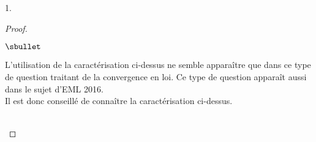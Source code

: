 \begin{noliste}{1.}
\begin{proof}
\begin{remark}
\begin{noliste}{$\sbullet$}
  \item L'utilisation de la caractérisation ci-dessus ne semble
    apparaître que dans ce type de question traitant de la convergence
    en loi. Ce type de question apparaît aussi dans le sujet d'EML
    2016.\\
    Il est donc conseillé de connaître la caractérisation ci-dessus.
  \end{noliste}
 \end{remark}~\\[-1.3cm]
\end{proof}
\end{noliste}



